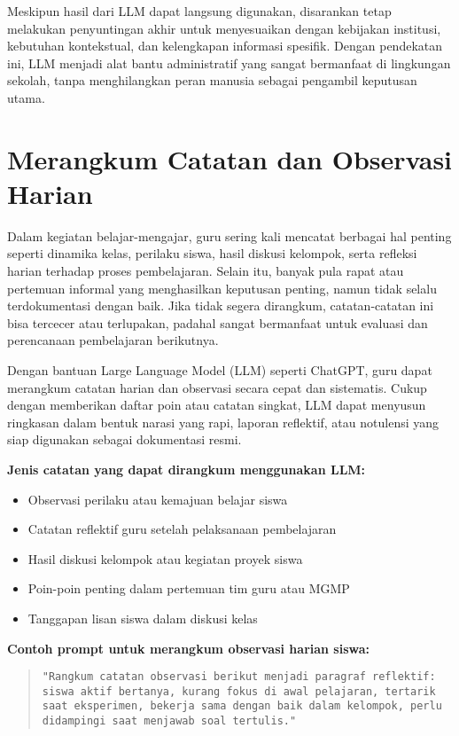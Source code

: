 Meskipun hasil dari LLM dapat langsung digunakan, disarankan tetap melakukan penyuntingan akhir untuk menyesuaikan dengan kebijakan institusi, kebutuhan kontekstual, dan kelengkapan informasi spesifik. Dengan pendekatan ini, LLM menjadi alat bantu administratif yang sangat bermanfaat di lingkungan sekolah, tanpa menghilangkan peran manusia sebagai pengambil keputusan utama.


\section{Merangkum Catatan dan Observasi Harian}

Dalam kegiatan belajar-mengajar, guru sering kali mencatat berbagai hal penting seperti dinamika kelas, perilaku siswa, hasil diskusi kelompok, serta refleksi harian terhadap proses pembelajaran. Selain itu, banyak pula rapat atau pertemuan informal yang menghasilkan keputusan penting, namun tidak selalu terdokumentasi dengan baik. Jika tidak segera dirangkum, catatan-catatan ini bisa tercecer atau terlupakan, padahal sangat bermanfaat untuk evaluasi dan perencanaan pembelajaran berikutnya.

Dengan bantuan Large Language Model (LLM) seperti ChatGPT, guru dapat merangkum catatan harian dan observasi secara cepat dan sistematis. Cukup dengan memberikan daftar poin atau catatan singkat, LLM dapat menyusun ringkasan dalam bentuk narasi yang rapi, laporan reflektif, atau notulensi yang siap digunakan sebagai dokumentasi resmi.

\textbf{Jenis catatan yang dapat dirangkum menggunakan LLM:}
\begin{itemize}
	\item Observasi perilaku atau kemajuan belajar siswa
	\item Catatan reflektif guru setelah pelaksanaan pembelajaran
	\item Hasil diskusi kelompok atau kegiatan proyek siswa
	\item Poin-poin penting dalam pertemuan tim guru atau MGMP
	\item Tanggapan lisan siswa dalam diskusi kelas
\end{itemize}

\textbf{Contoh prompt untuk merangkum observasi harian siswa:}

\begin{quote}
	\centering
	\texttt{"Rangkum catatan observasi berikut menjadi paragraf reflektif: siswa aktif bertanya, kurang fokus di awal pelajaran, tertarik saat eksperimen, bekerja sama dengan baik dalam kelompok, perlu didampingi saat menjawab soal tertulis."}
\end{quote}

